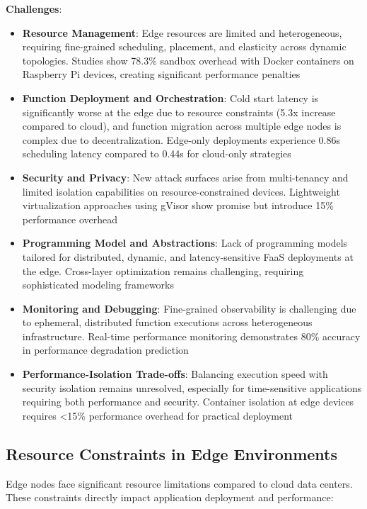 \textbf{Challenges}:
\begin{itemize}
    \item \textbf{Resource Management}: Edge resources are limited and heterogeneous, requiring fine-grained scheduling, placement, and elasticity across dynamic topologies. Studies show 78.3\% sandbox overhead with Docker containers on Raspberry Pi devices, creating significant performance penalties
    \item \textbf{Function Deployment and Orchestration}: Cold start latency is significantly worse at the edge due to resource constraints (5.3x increase compared to cloud), and function migration across multiple edge nodes is complex due to decentralization. Edge-only deployments experience 0.86s scheduling latency compared to 0.44s for cloud-only strategies
    \item \textbf{Security and Privacy}: New attack surfaces arise from multi-tenancy and limited isolation capabilities on resource-constrained devices. Lightweight virtualization approaches using gVisor show promise but introduce 15\% performance overhead
    \item \textbf{Programming Model and Abstractions}: Lack of programming models tailored for distributed, dynamic, and latency-sensitive FaaS deployments at the edge. Cross-layer optimization remains challenging, requiring sophisticated modeling frameworks
    \item \textbf{Monitoring and Debugging}: Fine-grained observability is challenging due to ephemeral, distributed function executions across heterogeneous infrastructure. Real-time performance monitoring demonstrates 80\% accuracy in performance degradation prediction
    \item \textbf{Performance-Isolation Trade-offs}: Balancing execution speed with security isolation remains unresolved, especially for time-sensitive applications requiring both performance and security. Container isolation at edge devices requires <15\% performance overhead for practical deployment
\end{itemize}

\subsection{Resource Constraints in Edge Environments}

Edge nodes face significant resource limitations compared to cloud data centers. These constraints directly impact application deployment and performance:

